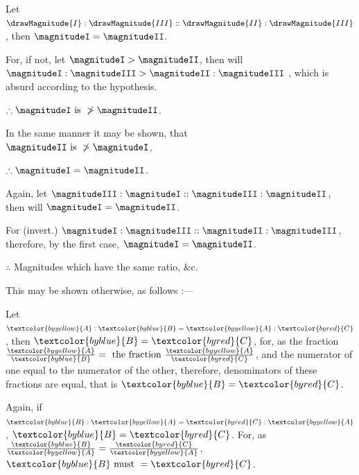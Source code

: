 \documentclass[booklanguage=english]{byrnebook}
\begin{document}
\vfill\pagebreak

\label{prop:V.IX}

\begin{center}
Let $\drawMagnitude{I} : \drawMagnitude{III} :: \drawMagnitude{II} : \drawMagnitude{III}$, then $\magnitudeI = \magnitudeII$.

For, if not, let $\magnitudeI > \magnitudeII$, then will\\
$\magnitudeI : \magnitudeIII > \magnitudeII : \magnitudeIII$ ,
which is absurd according to the hypothesis.

$\therefore \magnitudeI \mbox{ is } \ngtr \magnitudeII$. %

In the same manner it may be shown, that\\
$\magnitudeII \mbox{ is } \ngtr \magnitudeI$, %

$\therefore \magnitudeI = \magnitudeII$.

Again, let $\magnitudeIII : \magnitudeI :: \magnitudeIII : \magnitudeII$,\\
then will $\magnitudeI = \magnitudeII$.

For (invert.) $\magnitudeI : \magnitudeIII :: \magnitudeII : \magnitudeIII$,\\
therefore, by the first case, $\magnitudeI = \magnitudeII$.

$\therefore$ Magnitudes which have the same ratio, \&c.
\end{center}

This may be shown otherwise, as follows :—

Let $\textcolor{byyellow}{A} : \textcolor{byblue}{B} = \textcolor{byyellow}{A} : \textcolor{byred}{C}$, then $\textcolor{byblue}{B} = \textcolor{byred}{C}$, for, as the fraction $\frac{\textcolor{byyellow}{A}}{\textcolor{byblue}{B}} = \mbox{ the fraction } \frac{\textcolor{byyellow}{A}}{\textcolor{byred}{C}}$, and the numerator of one equal to the numerator of the other, therefore, denominators of these fractions are equal, that is $\textcolor{byblue}{B} = \textcolor{byred}{C}$.

Again, if $\textcolor{byblue}{B} : \textcolor{byyellow}{A} = \textcolor{byred}{C} : \textcolor{byyellow}{A}$, $\textcolor{byblue}{B} = \textcolor{byred}{C}$. For, as $\frac{\textcolor{byblue}{B}}{\textcolor{byyellow}{A}} = \frac{\textcolor{byred}{C}}{\textcolor{byyellow}{A}}$, $\textcolor{byblue}{B} \mbox{ must } = \textcolor{byred}{C}$.
\end{document}
